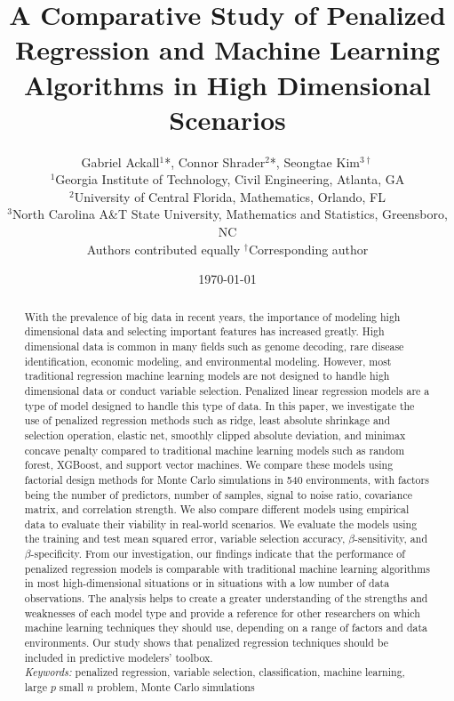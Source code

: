 \documentclass{article}
\title{A Comparative Study of Penalized Regression and Machine Learning Algorithms in High Dimensional Scenarios}
\author{Gabriel Ackall$^1$*, Connor Shrader$^2$*, Seongtae Kim$^{3\dagger}$\\
	{\footnotesize $^1$Georgia Institute of Technology, Civil Engineering, Atlanta, GA} \\
	{\footnotesize $^2$University of Central  Florida, Mathematics, Orlando, FL} \\
	{\footnotesize $^3$North Carolina A\&T State University, Mathematics and Statistics, Greensboro, NC} \\
	{\footnotesize *Authors contributed equally}
	{\footnotesize $^\dagger$Corresponding author}}
\date{\today}
\begin{document}
	\maketitle
	\begin{abstract}
		With the prevalence of big data in recent years, the importance of modeling high dimensional data and selecting important features has increased greatly. High dimensional data is common in many fields such as genome decoding, rare disease identification, economic modeling, and environmental modeling. However, most traditional regression machine learning models are not designed to handle high dimensional data or conduct variable selection. Penalized linear regression models are a type of model designed to handle this type of data. In this paper, we investigate the use of penalized regression methods such as ridge, least absolute shrinkage and selection operation, elastic net, smoothly clipped absolute deviation, and minimax concave penalty compared to traditional machine learning models such as random forest, XGBoost, and support vector machines. We compare these models using factorial design methods for Monte Carlo simulations in 540 environments, with factors being the number of predictors, number of samples, signal to noise ratio, covariance matrix, and correlation strength. We also compare different models using empirical data to evaluate their viability in real-world scenarios. We evaluate the models using the training and test mean squared error, variable selection accuracy, $\beta$-sensitivity, and $\beta$-specificity. From our investigation, our findings indicate that the performance of penalized regression models is comparable with traditional machine learning algorithms in most high-dimensional situations or in situations with a low number of data observations. The analysis helps to create a greater understanding of the strengths and weaknesses of each model type and provide a reference for other researchers on which machine learning techniques they should use, depending on a range of factors and data environments. Our study shows that penalized regression techniques should be included in predictive modelers’ toolbox. \\
		
		\textit{Keywords:} penalized regression, variable selection, classification, machine learning, large $p$ small $n$ problem, Monte Carlo simulations
	\end{abstract}
	
	\newpage
	
\end{document}
